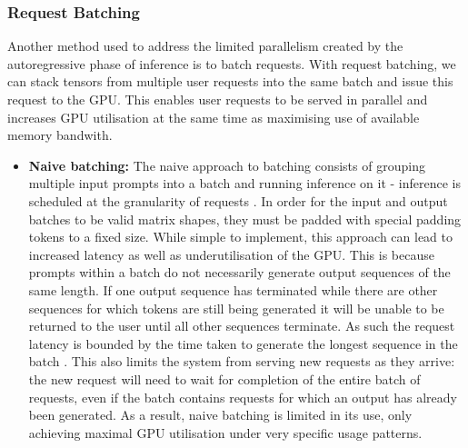 \documentclass[12pt,twoside]{report}
\begin{document}
\subsubsection{Request Batching}
Another method used to address the limited parallelism created by the autoregressive phase of inference is to batch requests. 
With request batching, we can stack tensors from multiple user requests into the same batch and issue this request to the GPU.
This enables user requests to be served in parallel and increases GPU utilisation at the same time as maximising use of available memory bandwith.

\begin{itemize}
  \item \textbf{Naive batching:} The naive approach to batching consists of grouping multiple input prompts into a batch and running inference on it - inference is scheduled at the granularity of requests \cite{yu2022orca}.
    In order for the input and output batches to be valid matrix shapes, they must be padded with special padding tokens to a fixed size.
    While simple to implement, this approach can lead to increased latency as well as underutilisation of the GPU. 
    This is because prompts within a batch do not necessarily generate output sequences of the same length. 
    If one output sequence has terminated while there are other sequences for which tokens are still being generated it will be unable to be returned to the user until all other sequences terminate.
    As such the request latency is bounded by the time taken to generate the longest sequence in the batch \cite{yu2022orca}.
    This also limits the system from serving new requests as they arrive: the new request will need to wait for completion of the entire batch of requests, even if the batch contains requests for which an output has already been generated.
    As a result, naive batching is limited in its use, only achieving maximal GPU utilisation under very specific usage patterns.


\end{itemize}
\end{document}

